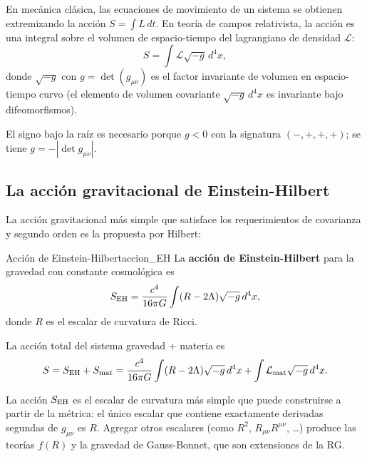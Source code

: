 En mecánica clásica, las ecuaciones de movimiento de un sistema se obtienen extremizando la acción $S = \int L\,dt$. En teoría de campos relativista, la acción es una integral sobre el volumen de espacio-tiempo del lagrangiano de densidad $\mathcal{L}$:
\begin{equation}
  S = \int \mathcal{L}\sqrt{-g}\,d^4x,
  \label{eq:accion_gen}
\end{equation}
donde $\sqrt{-g}$ con $g = \det(g_{\mu\nu})$ es el factor invariante de volumen en espacio-tiempo curvo (el elemento de volumen covariante $\sqrt{-g}\,d^4x$ es invariante bajo difeomorfismos).

\begin{importante}
El signo bajo la raíz es necesario porque $g < 0$ con la signatura $(-,+,+,+)$; se tiene $g = -|\det g_{\mu\nu}|$.
\end{importante}

\subsection{La acción gravitacional de Einstein-Hilbert}

La acción gravitacional más simple que satisface los requerimientos de covarianza y segundo orden es la propuesta por Hilbert:

\begin{definicion}{Acción de Einstein-Hilbert}{accion_EH}
La \textbf{acción de Einstein-Hilbert} para la gravedad con constante cosmológica es
\begin{equation}
  S_{\rm EH} = \frac{c^4}{16\pi G}\int (R - 2\Lambda)\sqrt{-g}\,d^4x,
  \label{eq:accion_EH}
\end{equation}
donde $R$ es el escalar de curvatura de Ricci.

La acción total del sistema gravedad + materia es
\begin{equation}
  S = S_{\rm EH} + S_{\rm mat} = \frac{c^4}{16\pi G}\int (R - 2\Lambda)\sqrt{-g}\,d^4x + \int\mathcal{L}_{\rm mat}\sqrt{-g}\,d^4x.
  \label{eq:accion_total}
\end{equation}
\end{definicion}

La acción $S_{\rm EH}$ es el escalar de curvatura más simple que puede construirse a partir de la métrica: el único escalar que contiene exactamente derivadas segundas de $g_{\mu\nu}$ es $R$. Agregar otros escalares (como $R^2$, $R_{\mu\nu}R^{\mu\nu}$, \ldots) produce las teorías $f(R)$ y la gravedad de Gauss-Bonnet, que son extensiones de la RG.

